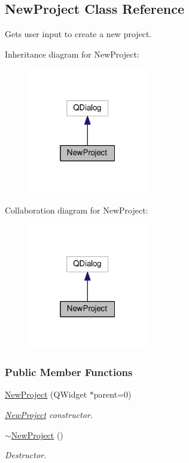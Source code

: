 \hypertarget{class_new_project}{}\subsection{New\+Project Class Reference}
\label{class_new_project}


Gets user input to create a new project.  




Inheritance diagram for New\+Project\+:\nopagebreak
\begin{figure}[H]
\begin{center}
\leavevmode
\includegraphics[width=148pt]{class_new_project__inherit__graph}
\end{center}
\end{figure}


Collaboration diagram for New\+Project\+:\nopagebreak
\begin{figure}[H]
\begin{center}
\leavevmode
\includegraphics[width=148pt]{class_new_project__coll__graph}
\end{center}
\end{figure}
\subsubsection*{Public Member Functions}
\begin{DoxyCompactItemize}
\item 
\hyperlink{group___window_ga011ff7a4c380f74bdafa4fdaed510c42}{New\+Project} (Q\+Widget $\ast$parent=0)
\begin{DoxyCompactList}\small\item\em \hyperlink{class_new_project}{New\+Project} constructor. \end{DoxyCompactList}\item 
\hyperlink{group___window_gae65155941598f4272f3df0b2f1428c78}{$\sim$\+New\+Project} ()
\begin{DoxyCompactList}\small\item\em Destructor. \end{DoxyCompactList}\end{DoxyCompactItemize}
